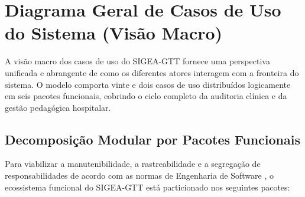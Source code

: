 \chapter{Diagrama Geral de Casos de Uso do Sistema (Visão Macro)}
\label{cap_diagrama_geral_macro}

A visão macro dos casos de uso do SIGEA-GTT fornece uma perspectiva unificada e abrangente de como os diferentes atores interagem com a fronteira do sistema. O modelo comporta vinte e dois casos de uso distribuídos logicamente em seis pacotes funcionais, cobrindo o ciclo completo da auditoria clínica e da gestão pedagógica hospitalar.

\section{Decomposição Modular por Pacotes Funcionais}
\label{sec_decomposicao_pacotes}

Para viabilizar a manutenibilidade, a rastreabilidade e a segregação de responsabilidades de acordo com as normas de Engenharia de Software \cite{sommerville2019}, o ecossistema funcional do SIGEA-GTT está particionado nos seguintes pacotes:

